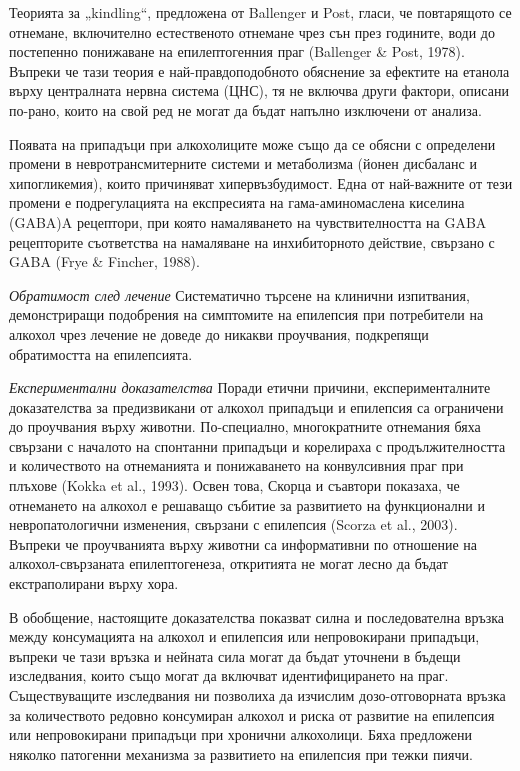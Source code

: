 \documentclass{article}
\begin{document}
Теорията за „kindling“, предложена от Ballenger и Post, гласи, че повтарящото се отнемане, включително естественото отнемане чрез сън през годините, води до постепенно понижаване на епилептогенния праг (Ballenger \& Post, 1978). Въпреки че тази теория е най-правдоподобното обяснение за ефектите на етанола върху централната нервна система (ЦНС), тя не включва други фактори, описани по-рано, които на свой ред не могат да бъдат напълно изключени от анализа.

Появата на припадъци при алкохолиците може също да се обясни с определени промени в невротрансмитерните системи и метаболизма (йонен дисбаланс и хипогликемия), които причиняват хипервъзбудимост. Една от най-важните от тези промени е подрегулацията на експресията на гама-аминомаслена киселина (GABA)A рецептори, при която намаляването на чувствителността на GABA рецепторите съответства на намаляване на инхибиторното действие, свързано с GABA (Frye \& Fincher, 1988).

\textit{Обратимост след лечение}
Систематично търсене на клинични изпитвания, демонстриращи
подобрения на симптомите на епилепсия при потребители на алкохол
чрез лечение не доведе до никакви проучвания, подкрепящи
обратимостта на епилепсията.

\textit{Експериментални доказателства}
Поради етични причини, експерименталните доказателства за предизвикани от алкохол припадъци и епилепсия са ограничени до проучвания върху животни.
По-специално, многократните отнемания бяха свързани с
началото на спонтанни припадъци и корелираха с продължителността и количеството на отнеманията и понижаването на конвулсивния праг при плъхове (Kokka et al., 1993). Освен това,
Скорца и съавтори показаха, че отнемането на алкохол е
решаващо събитие за развитието на функционални и невропатологични изменения, свързани с епилепсия (Scorza
et al., 2003). Въпреки че проучванията върху животни са информативни по отношение на алкохол-свързаната епилептогенеза, откритията не могат
лесно да бъдат екстраполирани върху хора.

В обобщение, настоящите доказателства показват силна и последователна връзка между консумацията на алкохол и епилепсия или непровокирани припадъци, въпреки че тази връзка и нейната сила могат да бъдат уточнени в бъдещи изследвания, които също могат да включват идентифицирането на праг. Съществуващите изследвания ни позволиха да изчислим дозо-отговорната връзка за количеството редовно консумиран алкохол и риска от развитие на епилепсия или непровокирани припадъци при хронични алкохолици. Бяха предложени няколко патогенни механизма за развитието на епилепсия при тежки пиячи.
\end{document}
